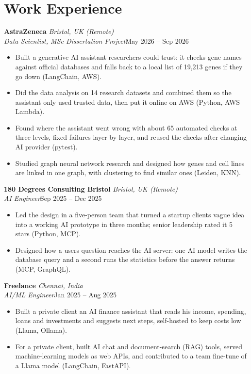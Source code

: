 \documentclass[a4paper,11pt]{article}
\newcommand{\role}[4]{%
  \textbf{#1}{\color{muted}\,\textperiodcentered\,\textit{#2}}\\
  \textit{#4}\hfill{\color{muted}#3}\par}
\newcommand{\gap}{\vspace{5pt}}
\begin{document}
\section{Work Experience}
\role{AstraZeneca}{Bristol, UK (Remote)}{May 2026 – Sep 2026}{Data Scientist, MSc Dissertation Project}
\begin{itemize}
  \item Built a generative AI assistant researchers could trust: it checks gene names against official databases and falls back to a local list of 19,213 genes if they go down (LangChain, AWS).
  \item Did the data analysis on 14 research datasets and combined them so the assistant only used trusted data, then put it online on AWS (Python, AWS Lambda).
  \item Found where the assistant went wrong with about 65 automated checks at three levels, fixed failures layer by layer, and reused the checks after changing AI provider (pytest).
  \item Studied graph neural network research and designed how genes and cell lines are linked in one graph, with clustering to find similar ones (Leiden, KNN).
\end{itemize}
\gap
{}
\role{180 Degrees Consulting Bristol}{Bristol, UK (Remote)}{Sep 2025 – Dec 2025}{AI Engineer}
\begin{itemize}
  \item Led the design in a five-person team that turned a startup client\textquotesingle{}s vague idea into a working AI prototype in three months; senior leadership rated it 5 stars (Python, MCP).
  \item Designed how a user\textquotesingle{}s question reaches the AI server: one AI model writes the database query and a second runs the statistics before the answer returns (MCP, GraphQL).
\end{itemize}
\gap
{}
\role{Freelance}{Chennai, India}{Jan 2025 – Aug 2025}{AI/ML Engineer}
\begin{itemize}
  \item Built a private client an AI finance assistant that reads his income, spending, loans and investments and suggests next steps, self-hosted to keep costs low (Llama, Ollama).
  \item For a private client, built AI chat and document-search (RAG) tools, served machine-learning models as web APIs, and contributed to a team fine-tune of a Llama model (LangChain, FastAPI).
\end{itemize}
\end{document}
